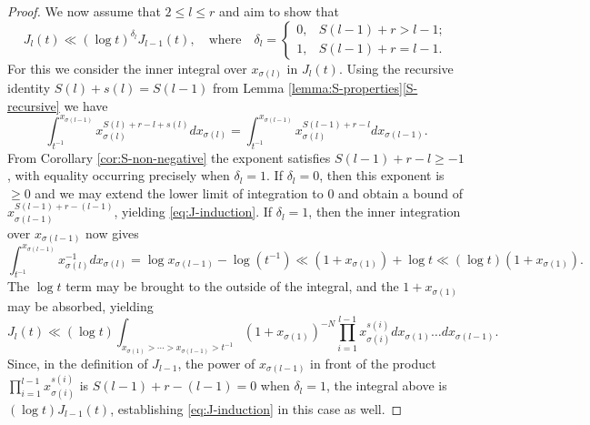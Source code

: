 \documentclass[12pt]{amsart}
\theoremstyle{remark}
\newtheorem{remark}[theorem]{Remark}
\begin{document}
\begin{proof}
We now assume that $2\le l\le r$ and aim to show that
\begin{equation}\label{eq:J-induction}
J_l(t)\ll (\log t)^{\delta_l} J_{l-1}(t),\quad\textrm{where}\quad
\delta_l=
\begin{cases} 
0,& S(l-1)+r> l-1;\\
1,& S(l-1)+r= l-1.
\end{cases}
\end{equation}
For this we consider the inner integral over $x_{\sigma(l)}$ in $J_l(t)$. Using the recursive identity $S(l)+s(l)=S(l-1)$ from Lemma \ref{lemma:S-properties}\eqref{S-recursive} we have
\[
\int_{ t^{-1}}^{ x_{\sigma(l-1)} } x_{\sigma(l)}^{S(l) +r-l+s(l)} dx_{\sigma(l)}=\int_{ t^{-1}}^{ x_{\sigma(l-1)} } x_{\sigma(l)}^{S(l-1) + r-l} dx_{\sigma(l-1)}.
\]
From Corollary \ref{cor:S-non-negative} the exponent satisfies $S(l-1) + r-l\ge -1$, with equality occurring precisely when $\delta_l=1$. If $\delta_l=0$, then this exponent is $\ge 0$ and we may extend the lower limit of integration to $0$ and obtain a bound of $x_{\sigma(l-1)}^{S(l-1) + r-(l-1)}$, yielding \eqref{eq:J-induction}. If $\delta_l = 1$, then the inner integration over $x_{\sigma(l-1)}$ now gives
\[
\int_{ t^{-1}}^{ x_{\sigma(l-1)} } x_{\sigma(l)}^{-1} dx_{\sigma(l)} = \log x_{\sigma(l-1)} - \log(t^{-1}) \ll  (1 + x_{\sigma(1)})+\log t\ll (\log t)(1 + x_{\sigma(1)}).
\]
The $\log t$ term may be brought to the outside of the integral, and the $1 + x_{\sigma(1)}$ may be absorbed, yielding
\[
J_l(t)\ll (\log t)\int_{ x_{\sigma(1)} > \cdots > x_{\sigma(l-1)} > t^{-1} } (1 + x_{\sigma(1)})^{-N}  \prod_{i = 1}^{l-1} x_{\sigma(i)}^{s(i) } dx_{\sigma(1)} \ldots dx_{\sigma(l-1)}.
\]
Since, in the definition of $J_{l-1}$, the power of $x_{\sigma(l-1)}$ in front of the product $\prod_{i=1}^{l-1}x_{\sigma(i)}^{s(i) }$ is $S(l-1)+r-(l-1)=0$ when $\delta_l=1$, the integral above is $(\log t)J_{l-1}(t)$, establishing \eqref{eq:J-induction} in this case as well.
\end{proof}

\end{document}
